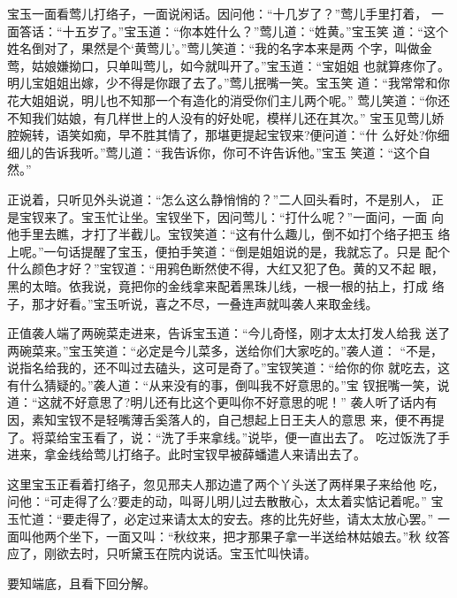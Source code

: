 宝玉一面看莺儿打络子，一面说闲话。因问他：“十几岁了？”莺儿手里打着，
一面答话：“十五岁了。”宝玉道：“你本姓什么？”莺儿道：“姓黄。”宝玉笑
道：“这个姓名倒对了，果然是个‘黄莺儿’。”莺儿笑道：“我的名字本来是两
个字，叫做金莺，姑娘嫌拗口，只单叫莺儿，如今就叫开了。”宝玉道：“宝姐姐
也就算疼你了。明儿宝姐姐出嫁，少不得是你跟了去了。”莺儿抿嘴一笑。宝玉笑
道：“我常常和你花大姐姐说，明儿也不知那一个有造化的消受你们主儿两个呢。”
莺儿笑道：“你还不知我们姑娘，有几样世上的人没有的好处呢，模样儿还在其次。”
宝玉见莺儿娇腔婉转，语笑如痴，早不胜其情了，那堪更提起宝钗来?便问道：“什
么好处?你细细儿的告诉我听。”莺儿道：“我告诉你，你可不许告诉他。”宝玉
笑道：“这个自然。”

正说着，只听见外头说道：“怎么这么静悄悄的？”二人回头看时，不是别人，
正是宝钗来了。宝玉忙让坐。宝钗坐下，因问莺儿：“打什么呢？”一面问，一面
向他手里去瞧，才打了半截儿。宝钗笑道：“这有什么趣儿，倒不如打个络子把玉
络上呢。”一句话提醒了宝玉，便拍手笑道：“倒是姐姐说的是，我就忘了。只是
配个什么颜色才好？”宝钗道：“用鸦色断然使不得，大红又犯了色。黄的又不起
眼，黑的太暗。依我说，竟把你的金线拿来配着黑珠儿线，一根一根的拈上，打成
络子，那才好看。”宝玉听说，喜之不尽，一叠连声就叫袭人来取金线。

正值袭人端了两碗菜走进来，告诉宝玉道：“今儿奇怪，刚才太太打发人给我
送了两碗菜来。”宝玉笑道：“必定是今儿菜多，送给你们大家吃的。”袭人道：
“不是，说指名给我的，还不叫过去磕头，这可是奇了。”宝钗笑道：“给你的你
就吃去，这有什么猜疑的。”袭人道：“从来没有的事，倒叫我不好意思的。”宝
钗抿嘴一笑，说道：“这就不好意思了?明儿还有比这个更叫你不好意思的呢！”
袭人听了话内有因，素知宝钗不是轻嘴薄舌奚落人的，自己想起上日王夫人的意思
来，便不再提了。将菜给宝玉看了，说：“洗了手来拿线。”说毕，便一直出去了。
吃过饭洗了手进来，拿金线给莺儿打络子。此时宝钗早被薛蟠遣人来请出去了。

这里宝玉正看着打络子，忽见邢夫人那边遣了两个丫头送了两样果子来给他
吃，问他：“可走得了么?要走的动，叫哥儿明儿过去散散心，太太着实惦记着呢。”
宝玉忙道：“要走得了，必定过来请太太的安去。疼的比先好些，请太太放心罢。”
一面叫他两个坐下，一面又叫：“秋纹来，把才那果子拿一半送给林姑娘去。”秋
纹答应了，刚欲去时，只听黛玉在院内说话。宝玉忙叫快请。

要知端底，且看下回分解。